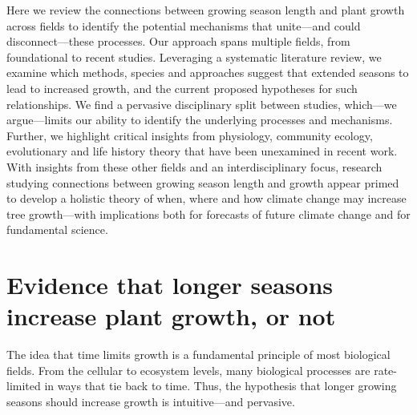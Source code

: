 \documentclass[11pt]{article}
\begin{document}
Here we review the connections between growing season length and plant growth across fields to identify the potential mechanisms that unite---and could disconnect---these processes. Our approach spans multiple fields, from foundational to recent studies. Leveraging a systematic literature review, we examine which methods, species and approaches suggest that extended seasons to lead to increased growth, and the current proposed hypotheses for such relationships. We find a pervasive disciplinary split between studies, which---we argue---limits our ability to identify the underlying processes and mechanisms. Further, we highlight critical insights from physiology, community ecology, evolutionary and life history theory that have been unexamined in recent work. With insights from these other fields and an interdisciplinary focus, research studying connections between growing season length and growth appear primed to develop a holistic theory of when, where and how climate change may increase tree growth---with implications both for forecasts of future climate change and for fundamental science.

\section*{Evidence that longer seasons increase plant growth, or not}
The idea that time limits growth is a fundamental principle of most biological fields. From the cellular to ecosystem levels, many biological processes are rate-limited in ways that tie back to time. Thus, the hypothesis that longer growing seasons should increase growth is intuitive---and pervasive. 
\end{document}
